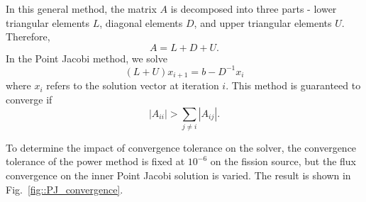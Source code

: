 \documentclass[12pt]{report}
\begin{document}
	In this general method, the matrix $A$ is decomposed into three parts - lower triangular elements $L$, diagonal elements $D$, and upper triangular elements $U$. Therefore,
	\begin{equation}
	A = L + D + U.
	\end{equation}
	In the Point Jacobi method, we solve
	\begin{equation}
	(L+U)x_{i+1} = b-D^{-1} x_i 
	\end{equation}
	where $x_i$ refers to the solution vector at iteration $i$. This method is guaranteed to converge if
	\begin{equation}
	\left|A_{ii}\right| > \sum_{j \neq i} \left|A_{ij}\right|.
	\end{equation}
	
	To determine the impact of convergence tolerance on the solver, the convergence tolerance of the power method is fixed at $10^{-6}$ on the fission source, but the flux convergence on the inner Point Jacobi solution is varied. The result is shown in Fig.~\ref{fig::PJ_convergence}.
\end{document}
